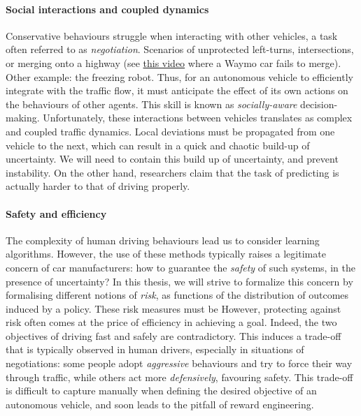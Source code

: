 \paragraph{Social interactions and coupled dynamics}

Conservative behaviours struggle when interacting with other vehicles, a task often referred to as \emph{negotiation}. Scenarios of unprotected left-turns, intersections, or merging onto a highway (see \eg \href{%
	https://www.youtube.com/watch?v=HjtiiGCe1pE}{this video} where a Waymo car fails to merge). Other example: the freezing robot.
Thus, for an autonomous vehicle to efficiently integrate with the traffic flow, it must anticipate the effect of its own actions on the behaviours of other agents. This skill is known as \emph{socially-aware} decision-making. Unfortunately, these interactions between vehicles translates as complex and coupled traffic dynamics. Local deviations must be propagated from one vehicle to the next, which can result in a quick and chaotic build-up of uncertainty. We will need to contain this build up of uncertainty, and prevent instability. On the other hand, researchers claim that the task of predicting is actually harder to that of driving properly.

\paragraph{Safety and efficiency}

The complexity of human driving behaviours lead us to consider learning algorithms. However, the use of these methods typically raises a legitimate concern of car manufacturers: how to guarantee the \emph{safety} of such systems, in the presence of uncertainty? In this thesis, we will strive to formalize this concern by formalising different notions of \emph{risk}, as functions of the distribution of outcomes induced by a policy. These risk measures must be  
However, protecting against risk often comes at the price of efficiency in achieving a goal. Indeed, the two objectives of driving fast and safely are contradictory. This induces a trade-off that is typically observed in human drivers, especially in situations of negotiations: some people adopt \emph{aggressive} behaviours and try to force their way through traffic, while others act more \emph{defensively}, favouring safety. This trade-off is difficult to capture manually when defining the desired objective of an autonomous vehicle, and soon leads to the pitfall of reward engineering.

